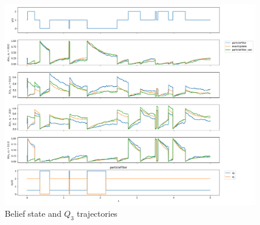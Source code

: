 \begin{figure}[H]
	\begin{center}
		\includegraphics[width=.60\textwidth]{figures/b_q_traj}
		\caption{Belief state and $ Q_3 $ trajectories}
		\label{fig:b_q_traj}
	\end{center}
\end{figure}

